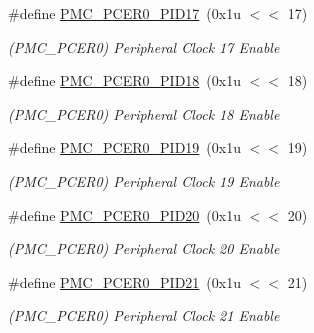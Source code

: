 \begin{DoxyCompactItemize}
\mbox{\label{group__SAME70__PMC_gae1740051655ee2a6807a4d3cb76dfedf}} 
\#define \mbox{\hyperlink{group__SAME70__PMC_gae1740051655ee2a6807a4d3cb76dfedf}{P\+M\+C\+\_\+\+P\+C\+E\+R0\+\_\+\+P\+I\+D17}}~(0x1u $<$$<$ 17)
\begin{DoxyCompactList}\small\item\em (P\+M\+C\+\_\+\+P\+C\+E\+R0) Peripheral Clock 17 Enable \end{DoxyCompactList}\item 
\mbox{\label{group__SAME70__PMC_ga26ffd6621b0af52c4472d3c36e446cd5}} 
\#define \mbox{\hyperlink{group__SAME70__PMC_ga26ffd6621b0af52c4472d3c36e446cd5}{P\+M\+C\+\_\+\+P\+C\+E\+R0\+\_\+\+P\+I\+D18}}~(0x1u $<$$<$ 18)
\begin{DoxyCompactList}\small\item\em (P\+M\+C\+\_\+\+P\+C\+E\+R0) Peripheral Clock 18 Enable \end{DoxyCompactList}\item 
\mbox{\label{group__SAME70__PMC_ga5abd1e01358b05a90ad9b9adbe752b8a}} 
\#define \mbox{\hyperlink{group__SAME70__PMC_ga5abd1e01358b05a90ad9b9adbe752b8a}{P\+M\+C\+\_\+\+P\+C\+E\+R0\+\_\+\+P\+I\+D19}}~(0x1u $<$$<$ 19)
\begin{DoxyCompactList}\small\item\em (P\+M\+C\+\_\+\+P\+C\+E\+R0) Peripheral Clock 19 Enable \end{DoxyCompactList}\item 
\mbox{\label{group__SAME70__PMC_gaa43417148b073c33fb18fd616349c2b5}} 
\#define \mbox{\hyperlink{group__SAME70__PMC_gaa43417148b073c33fb18fd616349c2b5}{P\+M\+C\+\_\+\+P\+C\+E\+R0\+\_\+\+P\+I\+D20}}~(0x1u $<$$<$ 20)
\begin{DoxyCompactList}\small\item\em (P\+M\+C\+\_\+\+P\+C\+E\+R0) Peripheral Clock 20 Enable \end{DoxyCompactList}\item 
\mbox{\label{group__SAME70__PMC_ga9218ee3952c7faf08fcf57dcdb048dc4}} 
\#define \mbox{\hyperlink{group__SAME70__PMC_ga9218ee3952c7faf08fcf57dcdb048dc4}{P\+M\+C\+\_\+\+P\+C\+E\+R0\+\_\+\+P\+I\+D21}}~(0x1u $<$$<$ 21)
\begin{DoxyCompactList}\small\item\em (P\+M\+C\+\_\+\+P\+C\+E\+R0) Peripheral Clock 21 Enable \end{DoxyCompactList}\item 
$$
\end{DoxyCompactItemize}
